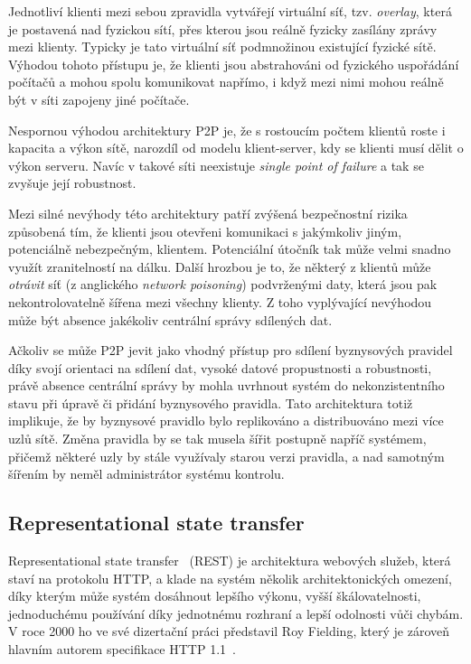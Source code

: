 Jednotliví klienti mezi sebou zpravidla vytvářejí virtuální síť, tzv. \textit{overlay},
která je postavená nad fyzickou sítí, přes kterou jsou reálně fyzicky zasílány zprávy mezi klienty.
Typicky je tato virtuální síť podmnožinou existující fyzické sítě. Výhodou tohoto přístupu je,
že klienti jsou abstrahováni od fyzického uspořádání počítačů a mohou spolu komunikovat napřímo,
i když mezi nimi mohou reálně být v síti zapojeny jiné počítače.

Nespornou výhodou architektury \gls{P2P} je, že s rostoucím počtem klientů roste i
kapacita a výkon sítě, narozdíl od modelu klient-server, kdy se klienti musí dělit o výkon serveru.
Navíc v takové síti neexistuje \textit{single point of failure} a tak se zvyšuje její robustnost.

Mezi silné nevýhody této architektury patří zvýšená bezpečnostní rizika způsobená tím,
že klienti jsou otevřeni komunikaci s jakýmkoliv jiným, potenciálně nebezpečným, klientem.
Potenciální útočník tak může velmi snadno využít zranitelností na dálku.
Další hrozbou je to, že některý z klientů může \textit{otrávit} síť
(z anglického \textit{network poisoning}) podvrženými daty, která jsou pak
nekontrolovatelně šířena mezi všechny klienty. Z toho vyplývající nevýhodou
může být absence jakékoliv centrální správy sdílených dat.

Ačkoliv se může \gls{P2P} jevit jako vhodný přístup pro sdílení byznysových pravidel
díky svojí orientaci na sdílení dat, vysoké datové propustnosti a robustnosti, právě absence
centrální správy by mohla uvrhnout systém do nekonzistentního stavu při úpravě či přidání
byznysového pravidla. Tato architektura totiž implikuje, že by byznysové pravidlo bylo
replikováno a distribuováno mezi více uzlů sítě. Změna pravidla by se tak musela šířit postupně
napříč systémem, přičemž některé uzly by stále využívaly starou verzi pravidla, a nad samotným
šířením by neměl administrátor systému kontrolu.

\subsection{Representational state transfer}\label{sec:rest}

Representational state transfer~\cite{fielding2000rest} (\gls{REST}) je architektura
webových služeb, která staví na protokolu \gls{HTTP}, a klade na systém
několik architektonických omezení, díky kterým může systém dosáhnout
lepšího výkonu, vyšší škálovatelnosti, jednoduchému používání díky jednotnému rozhraní
a lepší odolnosti vůči chybám. V roce 2000 ho ve své dizertační práci představil Roy Fielding,
který je zároveň hlavním autorem specifikace \gls{HTTP} 1.1~\cite{fielding1999hypertext}.

